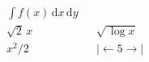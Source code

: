 \begin{align*}
& \int f(x)\,\mathrm{d}x\,\mathrm{d}y \\
& \sqrt2 \, x   && \sqrt{\,\log x} \\
& x^2 \! / 2    && |\!{\gets} 5 {\to}\!|
\end{align*}
